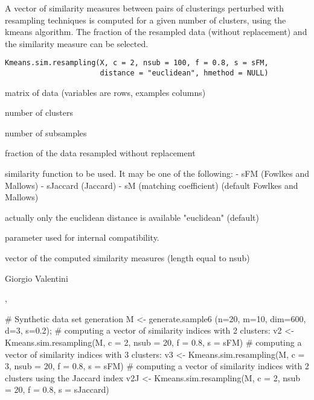 \documentclass{article}
\begin{document}
\begin{Description}\relax
A vector of similarity measures between pairs of clusterings perturbed with resampling techniques is computed for a given number of clusters,
using the kmeans algorithm.
The fraction of the resampled data (without replacement) and the similarity measure can be selected.
\end{Description}
\begin{Usage}
\begin{verbatim}
Kmeans.sim.resampling(X, c = 2, nsub = 100, f = 0.8, s = sFM, 
                      distance = "euclidean", hmethod = NULL)
\end{verbatim}
\end{Usage}
\begin{Arguments}
\begin{ldescription}
\item[\code{X}] matrix of data (variables are rows, examples columns) 
\item[\code{c}] number of clusters 
\item[\code{nsub}] number of subsamples 
\item[\code{f}] fraction of the data resampled without replacement 
\item[\code{s}] similarity function to be used. It may be one of the following: 
- sFM (Fowlkes and Mallows)
- sJaccard (Jaccard)
- sM (matching coefficient)
(default Fowlkes and Mallows) 
\item[\code{distance}] actually only the euclidean distance is available "euclidean" (default) 
\item[\code{hmethod}] parameter used for internal compatibility. 
\end{ldescription}
\end{Arguments}
\begin{Value}
vector of the computed similarity measures (length equal to nsub)
\end{Value}
\begin{Author}\relax
Giorgio Valentini 
\end{Author}
\begin{SeeAlso}\relax
{}, 
\end{SeeAlso}
\begin{Examples}
\begin{ExampleCode}
# Synthetic data set generation
M <- generate.sample6 (n=20, m=10, dim=600, d=3, s=0.2);
# computing a vector of similarity indices with 2 clusters:
v2 <- Kmeans.sim.resampling(M, c = 2, nsub = 20, f = 0.8, s = sFM)
# computing a vector of similarity indices with 3 clusters:
v3 <- Kmeans.sim.resampling(M, c = 3, nsub = 20, f = 0.8, s = sFM)
# computing a vector of similarity indices with 2 clusters using the Jaccard index
v2J <- Kmeans.sim.resampling(M, c = 2, nsub = 20, f = 0.8, s = sJaccard)
\end{ExampleCode}
\end{Examples}
\end{document}
